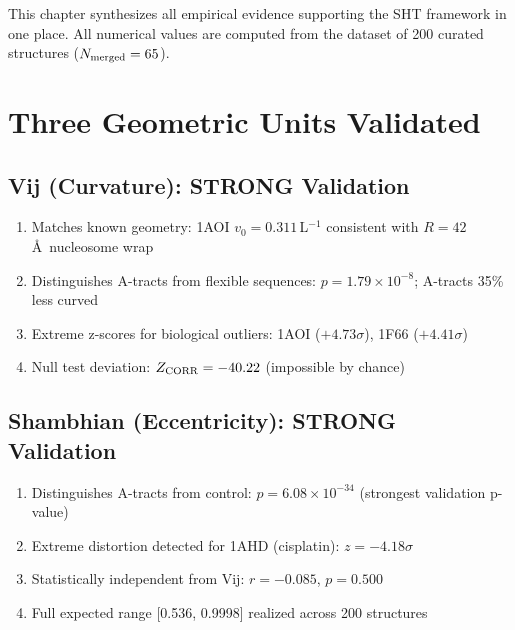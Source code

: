 

This chapter synthesizes all empirical evidence supporting the SHT framework in one place. All numerical values are computed from the dataset of 200 curated structures ($N_{\rm merged} = 65$).

\section{Three Geometric Units Validated}

\subsection{Vij (Curvature): STRONG Validation}

\begin{enumerate}
    \item[\checkmark] Matches known geometry: 1AOI $v_0 = 0.311$\,L$^{-1}$ consistent with $R = 42$\,\AA\ nucleosome wrap
    \item[\checkmark] Distinguishes A-tracts from flexible sequences: $p = 1.79 \times 10^{-8}$; A-tracts 35\% less curved
    \item[\checkmark] Extreme z-scores for biological outliers: 1AOI ($+4.73\sigma$), 1F66 ($+4.41\sigma$)
    \item[\checkmark] Null test deviation: $Z_{\rm CORR} = -40.22$ (impossible by chance)
\end{enumerate}

\subsection{Shambhian (Eccentricity): STRONG Validation}

\begin{enumerate}
    \item[\checkmark] Distinguishes A-tracts from control: $p = 6.08 \times 10^{-34}$ (strongest validation p-value)
    \item[\checkmark] Extreme distortion detected for 1AHD (cisplatin): $z = -4.18\sigma$
    \item[\checkmark] Statistically independent from Vij: $r = -0.085$, $p = 0.500$
    \item[\checkmark] Full expected range [0.536, 0.9998] realized across 200 structures
\end{enumerate}

